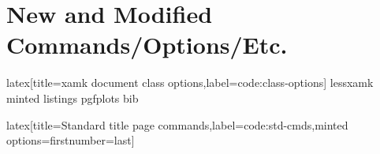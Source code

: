 \section{New and Modified Commands/Options/Etc.}

\begin{code}{latex}[title={xamk document class options},label=code:class-options]
lessxamk
minted
listings
pgfplots
bib
\end{code}
%
\begin{code}{latex}[title={Standard title page commands},label=code:std-cmds,minted options={firstnumber=last}]
\maketitle
\end{code}
%
